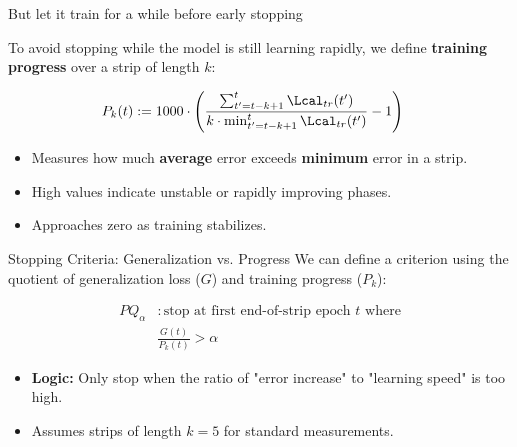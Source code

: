\documentclass[aspectratio=169,xcolor=dvipsnames,svgnames,x11names,fleqn]{beamer}
\begin{document}
\begin{frame}{But let it train for a while before early stopping}



To avoid stopping while the model is still learning rapidly, we define \textbf{training progress} over a strip of length $k$:
    
    \vfill
    
    \begin{align*}
        P_k(t) &:= 1000 \cdot \left( \frac{\sum_{t'=t-k+1}^{t} \Lcal_{tr}(t')}{k \cdot \min_{t'=t-k+1}^{t} \Lcal_{tr}(t')} - 1 \right)
    \end{align*}
    
    \vfill
    
    \begin{itemize}
        \item Measures how much \textbf{average} error exceeds \textbf{minimum} error in a strip.
        \item High values indicate unstable or rapidly improving phases.
        \item Approaches zero as training stabilizes.
    \end{itemize}
\end{frame}

\begin{frame}{Stopping Criteria: Generalization vs. Progress}
    We can define a criterion using the quotient of generalization loss ($G$) and training progress ($P_k$):
    
    \vfill
    
    \begin{align*}
        PQ_{\alpha} &: \text{stop at first end-of-strip epoch } t \text{ where} \\
        &\frac{G(t)}{P_k(t)} > \alpha
    \end{align*}
    
    \vfill
    
    \begin{itemize}
        \item \textbf{Logic:} Only stop when the ratio of "error increase" to "learning speed" is too high.
        \item Assumes strips of length $k=5$ for standard measurements.
    \end{itemize}
\end{frame}
\end{document}
